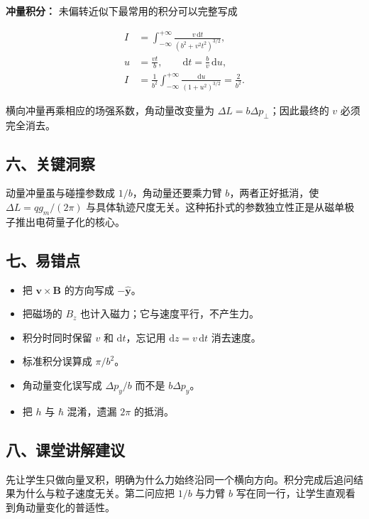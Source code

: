 \documentclass[12pt,a4paper,UTF8]{ctexart}
\newcommand{\tightlist}{\setlength{\itemsep}{0pt}\setlength{\parskip}{0pt}}
\begin{document}
\textbf{冲量积分：} 未偏转近似下最常用的积分可以完整写成

\[\begin{aligned}
I&=\int_{-\infty}^{+\infty}
\frac{v\,\mathrm dt}{(b^2+v^2t^2)^{3/2}},\\
u&=\frac{vt}{b},\qquad \mathrm dt=\frac b v\,\mathrm du,\\
I&=\frac1{b^2}\int_{-\infty}^{+\infty}
\frac{\mathrm du}{(1+u^2)^{3/2}}
=\frac{2}{b^2}.
\end{aligned}\]

横向冲量再乘相应的场强系数，角动量改变量为
\(\Delta L=b\Delta p_\perp\)；因此最终的 \(v\) 必须完全消去。

\subsection{六、关键洞察}\label{ux516dux5173ux952eux6d1eux5bdf-7}

动量冲量虽与碰撞参数成 \(1/b\)，角动量还要乘力臂 \(b\)，两者正好抵消，使
\(\Delta L=qg_m/(2\pi)\)
与具体轨迹尺度无关。这种拓扑式的参数独立性正是从磁单极子推出电荷量子化的核心。

\subsection{七、易错点}\label{ux4e03ux6613ux9519ux70b9-7}

\begin{itemize}
\tightlist
\item
  把 \(\boldsymbol v\times\boldsymbol B\) 的方向写成
  \(-\hat{\boldsymbol y}\)。
\item
  把磁场的 \(B_z\) 也计入磁力；它与速度平行，不产生力。
\item
  积分时同时保留 \(v\) 和 \(\mathrm dt\)，忘记用
  \(\mathrm dz=v\,\mathrm dt\) 消去速度。
\item
  标准积分误算成 \(\pi/b^2\)。
\item
  角动量变化误写成 \(\Delta p_y/b\) 而不是 \(b\Delta p_y\)。
\item
  把 \(h\) 与 \(\hbar\) 混淆，遗漏 \(2\pi\) 的抵消。
\end{itemize}

\subsection{八、课堂讲解建议}\label{ux516bux8bfeux5802ux8bb2ux89e3ux5efaux8bae-7}

先让学生只做向量叉积，明确为什么力始终沿同一个横向方向。积分完成后追问结果为什么与粒子速度无关。第二问应把
\(1/b\) 与力臂 \(b\) 写在同一行，让学生直观看到角动量变化的普适性。
\end{document}
